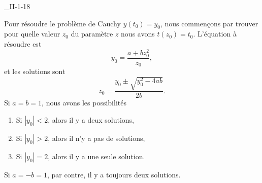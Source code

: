 \begin{corrige}{_II-1-18}
\begin{enumerate}
		Pour résoudre le problème de Cauchy $y(t_0)=y_0$, nous commençons par trouver pour quelle valeur $z_0$ du paramètre $z$ nous avons $t(z_0)=t_0$. L'équation à résoudre est
		\begin{equation}
			y_0=\frac{ a+bz_0^2 }{ z_0 },
		\end{equation}
		et les solutions sont
		\begin{equation}
			z_0=\frac{ y_0\pm\sqrt{y_0^2-4ab} }{ 2b }.
		\end{equation}
		Si $a=b=1$, nous avons les possibilités
		\begin{enumerate}

			\item
				Si $| y_0 |<2$, alors il y a deux solutions,
			\item
				Si $| y_0 |>2$, alors il n'y a pas de solutions,
			\item
				Si $| y_0 |=2$, alors il y a une seule solution.

		\end{enumerate}
		Si $a=-b=1$, par contre, il y a toujours deux solutions.
		
\end{enumerate}

\begin{alternative}

\begin{enumerate}


\end{enumerate}
\end{alternative}
\end{corrige}
